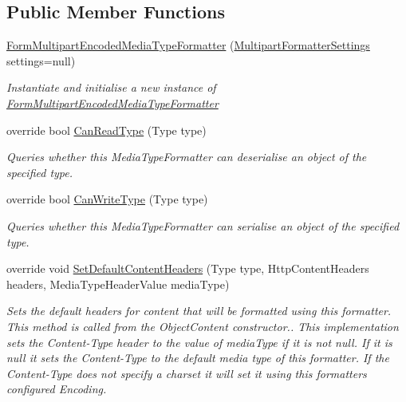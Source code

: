 \subsection*{Public Member Functions}
\begin{DoxyCompactItemize}
\item 
\hyperlink{classCqrs_1_1WebApi_1_1Formatters_1_1FormMultipart_1_1FormMultipartEncodedMediaTypeFormatter_a73f24dec1824edeaaa019bc0dfa1b2e2_a73f24dec1824edeaaa019bc0dfa1b2e2}{Form\+Multipart\+Encoded\+Media\+Type\+Formatter} (\hyperlink{classCqrs_1_1WebApi_1_1Formatters_1_1FormMultipart_1_1Infrastructure_1_1MultipartFormatterSettings}{Multipart\+Formatter\+Settings} settings=null)
\begin{DoxyCompactList}\small\item\em Instantiate and initialise a new instance of \hyperlink{classCqrs_1_1WebApi_1_1Formatters_1_1FormMultipart_1_1FormMultipartEncodedMediaTypeFormatter}{Form\+Multipart\+Encoded\+Media\+Type\+Formatter} \end{DoxyCompactList}\item 
override bool \hyperlink{classCqrs_1_1WebApi_1_1Formatters_1_1FormMultipart_1_1FormMultipartEncodedMediaTypeFormatter_a85006d7f413bbd7ceb2556b2ce68d402_a85006d7f413bbd7ceb2556b2ce68d402}{Can\+Read\+Type} (Type type)
\begin{DoxyCompactList}\small\item\em Queries whether this Media\+Type\+Formatter can deserialise an object of the specified type. \end{DoxyCompactList}\item 
override bool \hyperlink{classCqrs_1_1WebApi_1_1Formatters_1_1FormMultipart_1_1FormMultipartEncodedMediaTypeFormatter_a9fac23d803544c138f9e2fa75042a100_a9fac23d803544c138f9e2fa75042a100}{Can\+Write\+Type} (Type type)
\begin{DoxyCompactList}\small\item\em Queries whether this Media\+Type\+Formatter can serialise an object of the specified type. \end{DoxyCompactList}\item 
override void \hyperlink{classCqrs_1_1WebApi_1_1Formatters_1_1FormMultipart_1_1FormMultipartEncodedMediaTypeFormatter_a181d1b06501e0eda8667c6a4b844400b_a181d1b06501e0eda8667c6a4b844400b}{Set\+Default\+Content\+Headers} (Type type, Http\+Content\+Headers headers, Media\+Type\+Header\+Value media\+Type)
\begin{DoxyCompactList}\small\item\em Sets the default headers for content that will be formatted using this formatter. This method is called from the Object\+Content constructor.. This implementation sets the Content-\/\+Type header to the value of {\itshape media\+Type}  if it is not null. If it is null it sets the Content-\/\+Type to the default media type of this formatter. If the Content-\/\+Type does not specify a charset it will set it using this formatters configured Encoding. \end{DoxyCompactList}\item 

\end{DoxyCompactItemize}
